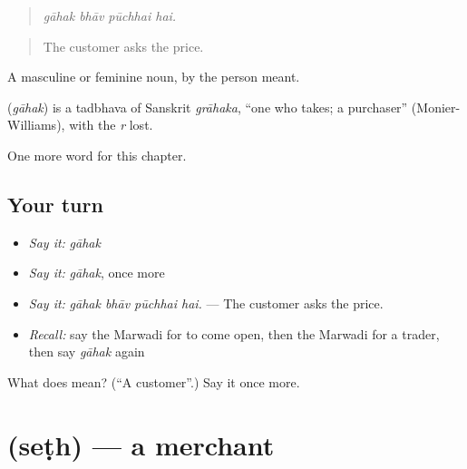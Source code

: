 \begin{quote}
   
\end{quote}

\begin{quote}
\emph{gāhak bhāv pūchhai hai.}
\end{quote}

\begin{quote}
The customer asks the price.
\end{quote}

A masculine or feminine noun, by the person meant.

\begin{cousinweb}
\textbf{} (\emph{gāhak}) is a tadbhava of Sanskrit \emph{grāhaka}, \textquotedblleft{}one who takes; a purchaser\textquotedblright{} (Monier-Williams), with the \emph{r} lost.
\end{cousinweb}

\begin{grammarlens}[title={What you've built}]
One more word for this chapter.
\end{grammarlens}

\subsection*{Your turn}
\begin{itemize}
\raggedright
  \item \emph{Say it:} \emph{gāhak}
  \item \emph{Say it:} \emph{gāhak}, once more
  \item \emph{Say it:} \emph{gāhak bhāv pūchhai hai.} — The customer asks the price.
  \item \emph{Recall:} say the Marwadi for to come open, then the Marwadi for a trader, then say \emph{gāhak} again
\end{itemize}

\begin{tcolorbox}[breakable,colback=teal!4,colframe=teal!35!black,title={Before you move on}]
What does  mean? (\textquotedblleft{}A customer\textquotedblright{}.) Say it once more.
\end{tcolorbox}
\section[\texorpdfstring{\mw{सेठ} (seṭh)}{सेठ (seṭh)}]{ (seṭh) — a merchant}

\label{lesson:MW-C209-seth}



